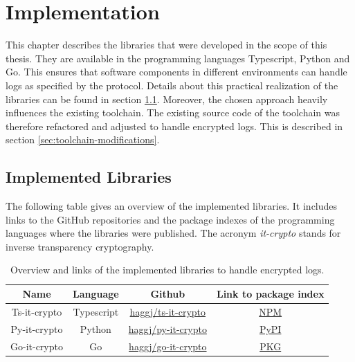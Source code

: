 \documentclass[../main.tex]{subfiles}
\begin{document}
\chapter{Implementation}
\label{chap:implementation}

This chapter describes the libraries that were developed in the scope of this thesis.
They are available in the programming languages Typescript, Python and Go.
This ensures that software components in different environments can handle logs as specified by the protocol.
Details about this practical realization of the libraries can be found in section \ref{sec:implemented-libraries}.
Moreover, the chosen approach heavily influences the existing toolchain.
The existing source code of the toolchain was therefore refactored and adjusted to handle encrypted logs.
This is described in section \ref{sec:toolchain-modifications}.

\section{Implemented Libraries}
\label{sec:implemented-libraries}

The following table gives an overview of the implemented libraries.
It includes links to the GitHub repositories and the package indexes of the programming languages where the libraries were published.
The acronym \emph{it-crypto} stands for inverse transparency cryptography.

\begin{table}[ht]
    \centering
    \begin{tabular}{|c|c|c|c|}
    \hline
    Name         & Language & Github                           & Link to package index                                   \\ \hline
    Ts-it-crypto & Typescript           & \href{https://github.com/haggj/ts-it-crypto}{haggj/ts-it-crypto} & \href{https://www.npmjs.com/package/ts-it-crypto}{NPM}       \\ \hline
    Py-it-crypto & Python               & \href{https://github.com/haggj/py-it-crypto}{haggj/py-it-crypto} & \href{https://pypi.org/project/py-it-crypto/}{PyPI}          \\ \hline
    Go-it-crypto & Go                   & \href{https://github.com/haggj/go-it-crypto}{haggj/go-it-crypto} & \href{https://pkg.go.dev/github.com/haggj/go-it-crypto}{PKG} \\ \hline
    \end{tabular}
    \caption[Overview implemented libraries]{Overview and links of the implemented libraries to handle encrypted logs.}
\end{table}
\end{document}
